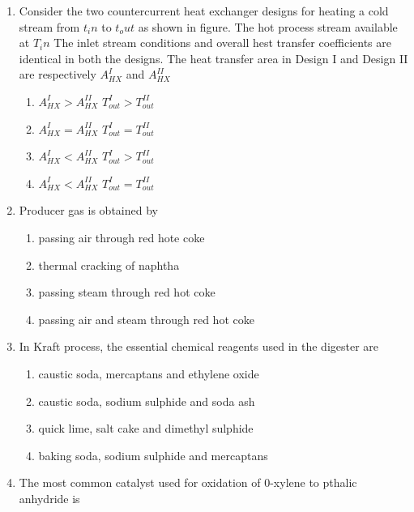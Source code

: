 \documentclass[journal]{IEEEtran}
\begin{document}
\begin{enumerate}
    \item Consider the two countercurrent heat exchanger designs for heating a cold stream from \textit{$t_in$} to \textit{$t_out$} as shown in figure. The hot process stream available at \textit{$T_in$} The inlet stream conditions and overall hest transfer coefficients are identical in both the designs. The heat transfer area in Design I and Design II are respectively $A^{I}_{HX}$ and $A^{II}_{HX}$ \\

    
\begin{enumerate}
     \item $A^{I}_{HX} > A^{II}_{HX}$ \hspace{5pt} $T^{I}_{out} > T^{II}_{out}$
    \item $A^{I}_{HX} = A^{II}_{HX}$ \hspace{5pt}  $T^{I}_{out} = T^{II}_{out}$
    \item $A^{I}_{HX} < A^{II}_{HX}$ \hspace{5pt}  $T^{I}_{out} > T^{II}_{out}$
    \item $A^{I}_{HX} < A^{II}_{HX}$  \hspace{5pt}  $T^{I}_{out} = T^{II}_{out}$
\end{enumerate} 
\bigskip
    \item Producer gas is obtained by

\begin{enumerate}
    \item passing air through red hote coke
    \item thermal cracking of naphtha
    \item passing steam through red hot coke
    \item passing air and steam through red hot coke
\end{enumerate}
\bigskip
    \item In Kraft process, the essential chemical reagents used in the digester are

\begin{enumerate}
    \item caustic soda, mercaptans and ethylene oxide
    \item caustic soda, sodium sulphide and soda ash
    \item quick lime, salt cake and dimethyl sulphide
    \item baking soda, sodium sulphide and mercaptans
\end{enumerate}
\bigskip
    \item The most common catalyst used for oxidation of 0-xylene to pthalic anhydride is


\end{enumerate}
\end{document}
